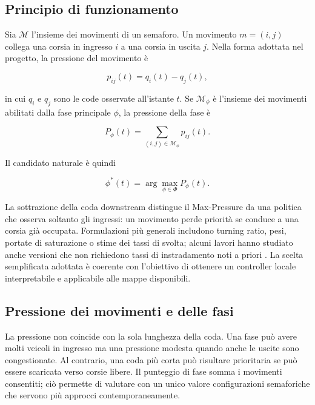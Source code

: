 \documentclass[12pt,a4paper,oneside]{report}
\numberwithin{equation}{chapter}
\begin{document}
\subsection{Principio di funzionamento}

Sia $\mathcal{M}$ l'insieme dei movimenti di un semaforo. Un movimento
$m=(i,j)$ collega una corsia in ingresso $i$ a una corsia in uscita $j$. Nella
forma adottata nel progetto, la pressione del movimento è

\begin{equation}
    p_{ij}(t)=q_i(t)-q_j(t),
    \label{eq:movement-pressure}
\end{equation}

in cui $q_i$ e $q_j$ sono le code osservate all'istante $t$. Se
$\mathcal{M}_\phi$ è l'insieme dei movimenti abilitati dalla fase principale
$\phi$, la pressione della fase è

\begin{equation}
    P_\phi(t)=\sum_{(i,j)\in\mathcal{M}_\phi}p_{ij}(t).
    \label{eq:phase-pressure}
\end{equation}

Il candidato naturale è quindi

\begin{equation}
    \phi^*(t)=\arg\max_{\phi\in\Phi}P_\phi(t).
    \label{eq:mp-choice}
\end{equation}

La sottrazione della coda downstream distingue il Max-Pressure da una politica
che osserva soltanto gli ingressi: un movimento perde priorità se conduce a
una corsia già occupata. Formulazioni più generali includono turning ratio,
pesi, portate di saturazione o stime dei tassi di svolta; alcuni lavori hanno
studiato anche versioni che non richiedono tassi di instradamento noti a priori
\cite{gregoire2014unknownrouting}. La scelta semplificata adottata è coerente
con l'obiettivo di ottenere un controller locale interpretabile e applicabile
alle mappe disponibili.

\subsection{Pressione dei movimenti e delle fasi}

La pressione non coincide con la sola lunghezza della coda. Una fase può avere
molti veicoli in ingresso ma una pressione modesta quando anche le uscite sono
congestionate. Al contrario, una coda più corta può risultare prioritaria se
può essere scaricata verso corsie libere. Il punteggio di fase somma i
movimenti consentiti; ciò permette di valutare con un unico valore configurazioni
semaforiche che servono più approcci contemporaneamente.
\end{document}
